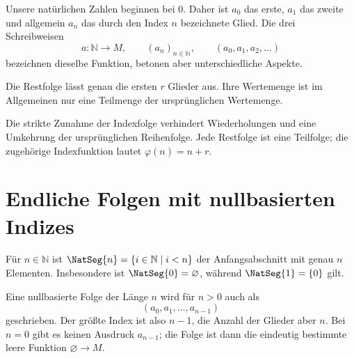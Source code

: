 \documentclass[main.tex]{subfiles}
\begin{document}
Unsere natürlichen Zahlen beginnen bei \(0\). Daher ist \(a_0\) das erste,
\(a_1\) das zweite und allgemein \(a_n\) das durch den Index \(n\)
bezeichnete Glied. Die drei Schreibweisen
\[
  a\colon\mathbb N\to M,
  \qquad (a_n)_{n\in\mathbb N},
  \qquad (a_0,a_1,a_2,\ldots)
\]
bezeichnen dieselbe Funktion, betonen aber unterschiedliche Aspekte.


Die Restfolge lässt genau die ersten \(r\) Glieder aus. Ihre Wertemenge ist
im Allgemeinen nur eine Teilmenge der ursprünglichen Wertemenge.


Die strikte Zunahme der Indexfolge verhindert Wiederholungen und eine
Umkehrung der ursprünglichen Reihenfolge. Jede Restfolge ist eine Teilfolge;
die zugehörige Indexfunktion lautet \(\varphi(n)=n+r\).

\section{Endliche Folgen mit nullbasierten Indizes}

Für \(n\in\mathbb N\) ist
\(\NatSeg{n}=\{i\in\mathbb N\mid i<n\}\) der Anfangsabschnitt mit genau
\(n\) Elementen. Insbesondere ist \(\NatSeg{0}=\varnothing\), während
\(\NatSeg{1}=\{0\}\) gilt.


Eine nullbasierte Folge der Länge \(n\) wird für \(n>0\) auch als
\[
  (a_0,a_1,\ldots,a_{n-1})
\]
geschrieben. Der größte Index ist also \(n-1\), die Anzahl der Glieder aber
\(n\). Bei \(n=0\) gibt es keinen Ausdruck \(a_{n-1}\); die Folge ist dann
die eindeutig bestimmte leere Funktion \(\varnothing\to M\).
\end{document}
